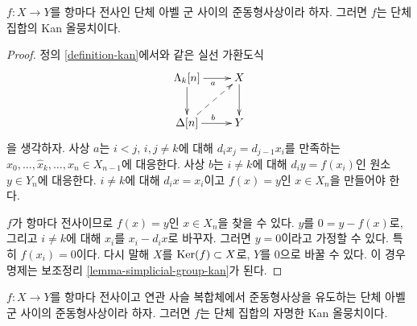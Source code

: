 \begin{lemma}
\label{lemma-surjection-simplicial-abelian-groups-kan}
$f : X \to Y$를 항마다 전사인 단체 아벨 군 사이의 준동형사상이라
하자. 그러면 $f$는 단체 집합의 Kan 올뭉치이다.
\end{lemma}

\begin{proof}
정의 \ref{definition-kan}에서와 같은 실선 가환도식
$$
\xymatrix{
\Lambda_k[n] \ar[r]_a \ar[d] & X \ar[d] \\
\Delta[n] \ar[r]^b \ar@{-->}[ru] & Y
}
$$
을 생각하자. 사상 $a$는 $i < j$, $i, j \not = k$에 대해
$d_i x_j = d_{j - 1} x_i$를 만족하는
$x_0, \ldots, \hat x_k, \ldots, x_n \in X_{n - 1}$에 대응한다.
사상 $b$는 $i \not = k$에 대해 $d_iy = f(x_i)$인 원소
$y \in Y_n$에 대응한다. $i \not = k$에 대해 $d_ix = x_i$이고
$f(x) = y$인 $x \in X_n$을 만들어야 한다.

\medskip\noindent
$f$가 항마다 전사이므로 $f(x) = y$인 $x \in X_n$을 찾을 수 있다.
$y$를 $0 = y - f(x)$로, 그리고 $i \not = k$에 대해 $x_i$를
$x_i - d_ix$로 바꾸자. 그러면 $y = 0$이라고 가정할 수 있다.
특히 $f(x_i) = 0$이다. 다시 말해 $X$를 $\mathop{\mathrm{Ker}}(f) \subset X$로,
$Y$를 $0$으로 바꿀 수 있다. 이 경우 명제는 보조정리
\ref{lemma-simplicial-group-kan}가 된다.
\end{proof}

\begin{lemma}
\label{lemma-qis-simplicial-abelian-groups}
$f : X \to Y$를 항마다 전사이고 연관 사슬 복합체에서 준동형사상을
유도하는 단체 아벨 군 사이의 준동형사상이라 하자. 그러면 $f$는 단체
집합의 자명한 Kan 올뭉치이다.
\end{lemma}

